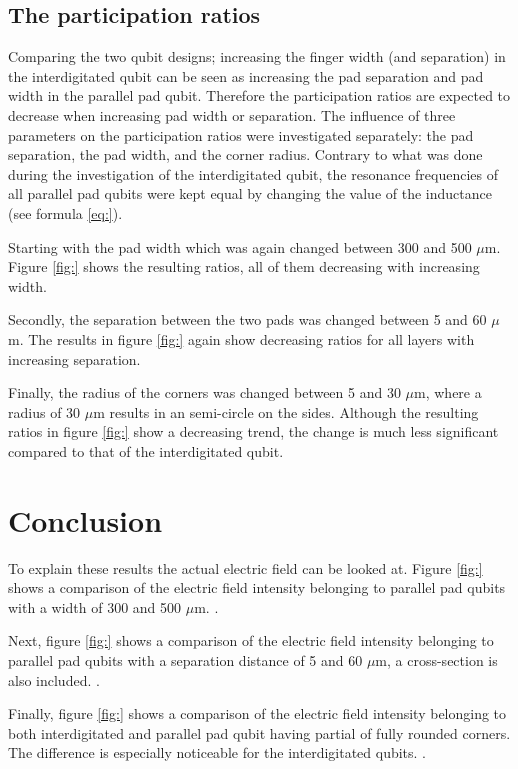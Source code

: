 \subsection{The participation ratios}
 Comparing the two qubit designs; increasing the finger width (and separation) in the interdigitated qubit can be seen as increasing the pad separation and pad width in the parallel pad qubit. Therefore the participation ratios are expected to decrease when increasing pad width or separation. The influence of three parameters on the participation ratios were investigated separately: the pad separation, the pad width, and the corner radius. Contrary to what was done during the investigation of the interdigitated qubit, the resonance frequencies of all parallel pad qubits were kept equal by changing the value of the inductance (see formula \eqref{eq:}). 
 
 Starting with the pad width which was again changed between 300 and 500 \(\mu\)m. Figure \ref{fig:} shows the resulting ratios, all of them decreasing with increasing width.
 
 Secondly, the separation between the two pads was changed between 5 and 60 \(\mu\)m. The results in figure \ref{fig:} again show decreasing ratios for all layers with increasing separation. 
 
 Finally, the radius of the corners was changed between 5 and 30 \(\mu\)m, where a radius of 30 \(\mu\)m results in an semi-circle on the sides. Although the resulting ratios in figure \ref{fig:} show a decreasing trend, the change is much less significant compared to that of the interdigitated qubit.
 
\section{Conclusion}
To explain these results the actual electric field can be looked at. Figure \ref{fig:} shows a comparison of the electric field intensity belonging to parallel pad qubits with a width of 300 and 500 \(\mu\)m. .
 
Next, figure \ref{fig:} shows a comparison of the electric field intensity belonging to parallel pad qubits with a separation distance of 5 and 60 \(\mu\)m, a cross-section is also included. .
 
Finally, figure \ref{fig:} shows a comparison of the electric field intensity belonging to both interdigitated and parallel pad qubit having partial of fully rounded corners. The difference is especially noticeable for the interdigitated qubits. .
  




    